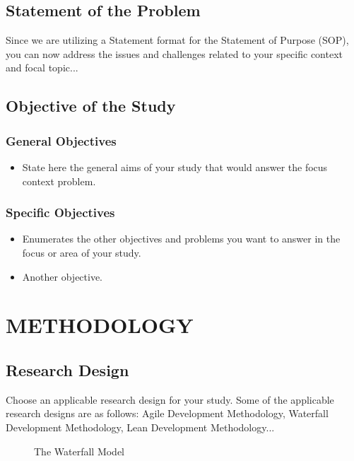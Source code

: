 \documentclass[12pt]{report}
\begin{document}
	
	\section{Statement of the Problem}
	Since we are utilizing a Statement format for the Statement of Purpose (SOP), you can now address the issues and challenges related to your specific context and focal topic...
	
	\section{Objective of the Study}
	\subsection{General Objectives}
	\begin{itemize}
		\item State here the general aims of your study that would answer the focus context problem.
	\end{itemize}
	
	\subsection{Specific Objectives}
	\begin{itemize}
		\item Enumerates the other objectives and problems you want to answer in the focus or area of your study.
		\item Another objective.
	\end{itemize}
	
	
	\chapter{METHODOLOGY}
	
	\section{Research Design}
	Choose an applicable research design for your study. Some of the applicable research designs are as follows: Agile Development Methodology, Waterfall Development Methodology, Lean Development Methodology...
	
	\begin{figure}[h]
		\centering
		\caption{The Waterfall Model}
		\label{fig:waterfall}
	\end{figure}
	
\end{document}
